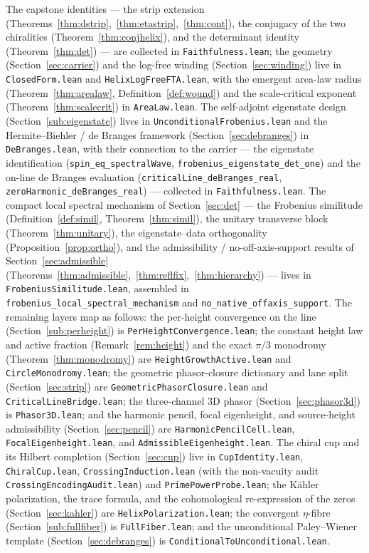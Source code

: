 \documentclass[11pt]{article}
\newcommand{\code}[1]{\texttt{#1}}
\begin{document}
The capstone identities --- the strip extension (Theorems~\ref{thm:dstrip},~\ref{thm:etastrip},~\ref{thm:cont}),
the conjugacy of the two chiralities (Theorem~\ref{thm:conjhelix}), and the determinant identity
(Theorem~\ref{thm:det}) --- are collected in \code{Faithfulness.lean}; the geometry
(Section~\ref{sec:carrier}) and the log-free winding (Section~\ref{sec:winding}) live in
\code{ClosedForm.lean} and \code{HelixLogFreeFTA.lean}, with the emergent area-law radius
(Theorem~\ref{thm:arealaw}, Definition~\ref{def:wound}) and the scale-critical exponent
(Theorem~\ref{thm:scalecrit}) in \code{AreaLaw.lean}. The self-adjoint eigenstate design
(Section~\ref{sub:eigenstate}) lives in \code{UnconditionalFrobenius.lean} and the Hermite--Biehler /
de Branges framework (Section~\ref{sec:debranges}) in \code{DeBranges.lean}, with their connection to
the carrier --- the eigenstate identification (\code{spin\_eq\_spectralWave},
\code{frobenius\_eigenstate\_det\_one}) and the on-line de Branges evaluation
(\code{criticalLine\_deBranges\_real}, \code{zeroHarmonic\_deBranges\_real}) --- collected in
\code{Faithfulness.lean}. The compact local spectral mechanism of Section~\ref{sec:det} --- the
Frobenius similitude (Definition~\ref{def:simil}, Theorem~\ref{thm:simil}), the unitary transverse
block (Theorem~\ref{thm:unitary}), the eigenstate--data orthogonality
(Proposition~\ref{prop:ortho}), and the admissibility / no-off-axis-support results of
Section~\ref{sec:admissible} (Theorems~\ref{thm:admissible},~\ref{thm:reflfix},~\ref{thm:hierarchy})
--- lives in \code{FrobeniusSimilitude.lean}, assembled in
\code{frobenius\_local\_spectral\_mechanism} and \code{no\_native\_offaxis\_support}.
The remaining layers map as follows: the per-height convergence on the line
(Section~\ref{sub:perheight}) is \code{PerHeightConvergence.lean}; the constant height law and active
fraction (Remark~\ref{rem:height}) and the exact $\pi/3$ monodromy (Theorem~\ref{thm:monodromy}) are
\code{HeightGrowthActive.lean} and \code{CircleMonodromy.lean}; the geometric phasor-closure dictionary
and lane split (Section~\ref{sec:strip}) are \code{GeometricPhasorClosure.lean} and
\code{CriticalLineBridge.lean}; the three-channel 3D phasor (Section~\ref{sec:phasor3d}) is
\code{Phasor3D.lean}; and the harmonic pencil, focal eigenheight, and source-height admissibility
(Section~\ref{sec:pencil}) are \code{HarmonicPencilCell.lean}, \code{FocalEigenheight.lean}, and
\code{AdmissibleEigenheight.lean}. The chiral cup and its Hilbert completion (Section~\ref{sec:cup})
live in \code{CupIdentity.lean}, \code{ChiralCup.lean}, \code{CrossingInduction.lean} (with the
non-vacuity audit \code{CrossingEncodingAudit.lean}) and \code{PrimePowerProbe.lean}; the K\"ahler
polarization, the trace formula, and the cohomological re-expression of the zeros (Section~\ref{sec:kahler}) are
\code{HelixPolarization.lean}; the convergent $\eta$-fibre (Section~\ref{sub:fullfiber}) is
\code{FullFiber.lean}; and the unconditional Paley--Wiener template (Section~\ref{sec:debranges}) is
\code{ConditionalToUnconditional.lean}.
\end{document}
